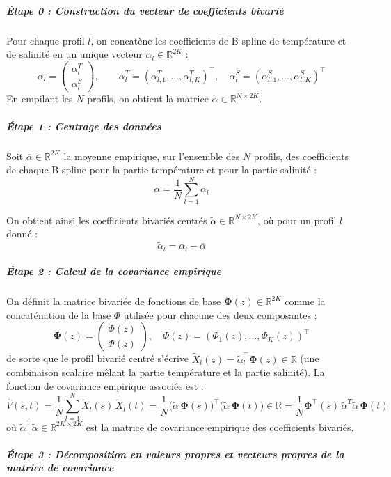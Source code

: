 \documentclass{article}
\begin{document}
	\subparagraph{Étape 0 : Construction du vecteur de coefficients bivarié}
	Pour chaque profil $l$, on concatène les coefficients de B-spline de température et de salinité en un unique vecteur $\alpha_l \in \mathbb{R}^{2K}$ :
	\[
	\alpha_l = \begin{pmatrix} \alpha_l^{T} \\ \alpha_l^{S} \end{pmatrix}, 
	\qquad \alpha_l^{T} = (\alpha_{l,1}^T, \ldots, \alpha_{l,K}^T)^\top, 
	\quad \alpha_l^{S} = (\alpha_{l,1}^S, \ldots, \alpha_{l,K}^S)^\top
	\]
	En empilant les $N$ profils, on obtient la matrice $\alpha \in \mathbb{R}^{N \times 2K}$.
	
	\subparagraph{Étape 1 : Centrage des données}
	Soit $\overline{\alpha} \in \mathbb{R}^{2K}$ la moyenne empirique, sur l'ensemble des $N$ profils, des coefficients de chaque B-spline pour la partie température et pour la partie salinité :
	\[
	\overline{\alpha} = \frac{1}{N} \sum_{l=1}^{N} \alpha_l
	\]
	
	On obtient ainsi les coefficients bivariés centrés $\tilde{\alpha} \in \mathbb{R}^{N \times 2K}$, où pour un profil $l$ donné :
	\[
	\tilde{\alpha}_{l} = \alpha_{l} - \overline{\alpha}
	\]
	
	\subparagraph{Étape 2 : Calcul de la covariance empirique}
	
	On définit la matrice bivariée de fonctions de base $\boldsymbol{\Phi}(z) \in \mathbb{R}^{2K}$ comme la concaténation de la base $\Phi$ utilisée pour chacune des deux composantes :
	\[
	\boldsymbol{\Phi}(z) = \begin{pmatrix} \Phi(z) \\ \Phi(z) \end{pmatrix}, 
	\quad \Phi(z) = (\Phi_1(z), \ldots, \Phi_K(z))^\top
	\]
	de sorte que le profil bivarié centré s'écrive $\tilde X_l(z) = \tilde\alpha_l^\top \boldsymbol{\Phi}(z) \in \mathbb{R}$ (une combinaison scalaire mêlant la partie température et la partie salinité). La fonction de covariance empirique associée est :
	\[
	\hat V(s, t) = \frac{1}{N}\sum_{l=1}^{N} \tilde X_l(s)\, \tilde X_l(t)
	= \frac{1}{N} \big(\tilde{\alpha}\,\boldsymbol{\Phi}(s)\big)^{\top} \big(\tilde{\alpha}\,\boldsymbol{\Phi}(t)\big) \in \mathbb{R}
	= \frac{1}{N} \boldsymbol{\Phi}^\top(s)\,\tilde{\alpha}^{T} \tilde{\alpha}\,\boldsymbol{\Phi}(t)
	\]
	où $\tilde\alpha^\top\tilde\alpha \in \mathbb{R}^{2K \times 2K}$ est la matrice de covariance empirique des coefficients bivariés.
	
	\subparagraph{Étape 3 : Décomposition en valeurs propres et vecteurs propres de la matrice de covariance}
	
\end{document}
